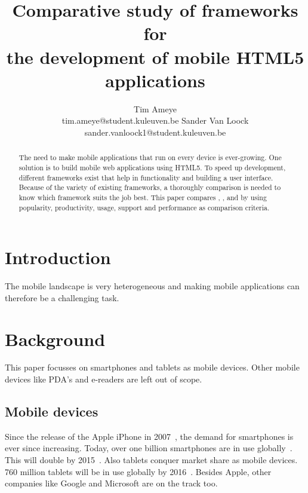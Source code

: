 \documentclass[a4paper]{artikel3}
\title{Comparative study of frameworks for \\ the development of mobile HTML5 applications}
\author{Tim Ameye \\ tim.ameye@student.kuleuven.be \And Sander Van Loock \\ sander.vanloock1@student.kuleuven.be}
\begin{document}
\maketitle

\begin{abstract}
The need to make mobile applications that run on every device is ever-growing.
One solution is to build mobile web applications using HTML5.
To speed up development, different frameworks exist that help in functionality and building a user interface.
Because of the variety of existing frameworks, a thoroughly comparison is needed to know which framework suits the job best.
This paper compares \st{}, \jqm{}, \kendo{} and \lungo{} by using popularity, productivity, usage, support and performance as comparison criteria. 
\end{abstract}


\section{Introduction} %
\label{sec:introduction}
The mobile landscape is very heterogeneous and making mobile applications can therefore be a challenging task.

\section{Background}
This paper focusses on smartphones and tablets as mobile devices. 
Other mobile devices like PDA's and e-readers are left out of scope.

\subsection{Mobile devices}
Since the release of the Apple iPhone in 2007~\cite{David2011}, the demand for smartphones is ever since increasing. 
Today, over one billion smartphones are in use globally~\cite{Yang2012}.
This will double by 2015~\cite{Gillett2012}.
Also tablets conquer market share as mobile devices.
760 million tablets will be in use globally by 2016~\cite{Gillett2012}.
Besides Apple, other companies like Google and Microsoft are on the track too.
\end{document}
